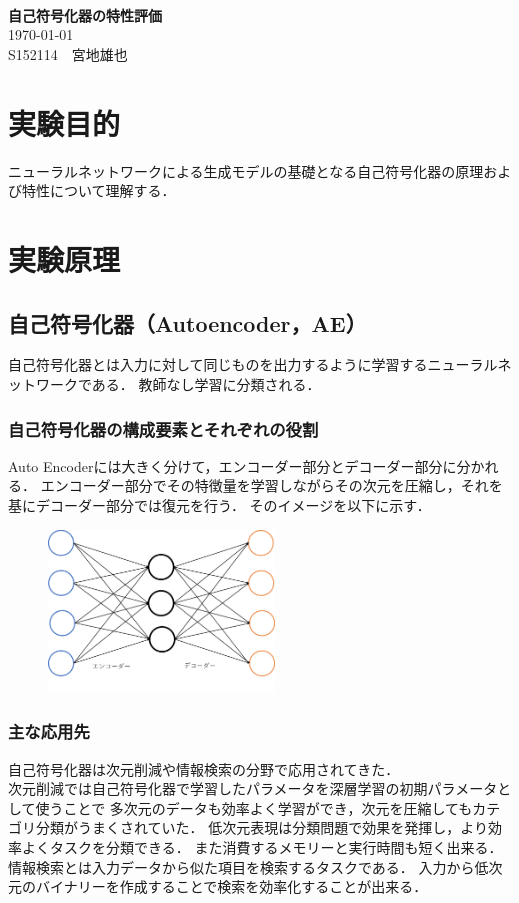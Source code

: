 \documentclass[12pt]{jsarticle}
\newcommand{\frontpage}[3]{%
\begin{center}
　\\
\vspace{15em}{\LARGE{}レポート課題}\\
　\\
{\Huge\bf#1}\\
\vspace{30em}
{\LARGE\today}\\
\vspace{2em}
{\LARGE#2　#3}
\end{center}
\thispagestyle{empty}
\clearpage
\setcounter{page}{1}
}
\begin{document}
\frontpage
{自己符号化器の特性評価}
{S152114}
{宮地雄也}

\section{実験目的}

ニューラルネットワークによる生成モデルの基礎となる自己符号化器の原理および特性について理解する．

\section{実験原理}

\subsection{自己符号化器（Autoencoder，AE）}
自己符号化器とは入力に対して同じものを出力するように学習するニューラルネットワークである．
教師なし学習に分類される．


\subsubsection{自己符号化器の構成要素とそれぞれの役割}
Auto Encoderには大きく分けて，エンコーダー部分とデコーダー部分に分かれる．
エンコーダー部分でその特徴量を学習しながらその次元を圧縮し，それを基にデコーダー部分では復元を行う．
そのイメージを以下に示す．
\begin{figure}[ht]
  \begin{center}
    \includegraphics[width = 6cm]{AE_image.png}
  \end{center}
\end{figure}


\subsubsection{主な応用先}
自己符号化器は次元削減や情報検索の分野で応用されてきた．\\
次元削減では自己符号化器で学習したパラメータを深層学習の初期パラメータとして使うことで
多次元のデータも効率よく学習ができ，次元を圧縮してもカテゴリ分類がうまくされていた．
低次元表現は分類問題で効果を発揮し，より効率よくタスクを分類できる．
また消費するメモリーと実行時間も短く出来る．
\\
情報検索とは入力データから似た項目を検索するタスクである．
入力から低次元のバイナリーを作成することで検索を効率化することが出来る．
\\
\end{document}
